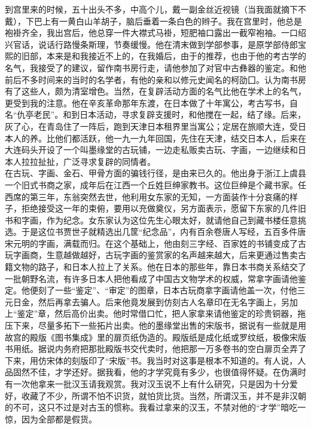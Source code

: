 到宫里来的时候，五十出头不多，中高个儿，戴一副金丝近视镜（当我面就摘下不戴），下巴上有一黄白山羊胡子，脑后垂着一条白色的辫子。我在宫里时，他总是袍褂齐全，我出宫后，他总穿一件大襟式马褂，短肥袖口露出一截窄袍袖。一口绍兴官话，说话行路慢条斯理，节奏缓慢。他在清末做到学部参事，是原学部侍郎宝熙的旧部，本来是和我接近不上的，在我婚后，由于的推荐，也由于他的考古学的名气，我接受了的建议，留作南书房行走，请他参加了对官中古彝器的鉴定。和他前后不多时间来的当时的名学者，有他的亲和以修元史闻名的柯劭囗。认为南书房有了这些人，颇为清室增色。当然，在复辟活动方面的名气比他在学术上的名气，更受到我的注意。他在辛亥革命那年东渡，在日本做了十年寓公，考古写书，自名“仇亭老民”。和到日本活动，寻求复辟支援时，和他搅在一起，结了缘。后来，灰了心，在青岛住了一阵后，跑到天津日本租界里当寓公；定居在旅顺大连，受日本人的养。比他们都活跃，他一九一九年回国，先住在天津，结交日本人，后来在大连码头开设了一个叫墨缘堂的古玩铺，一边走私贩卖古玩、字画，一边继续和日本人拉拉扯扯，广泛寻求复辟的同情者。\\

在古玩、字画、金石、甲骨方面的骗钱行径，是由来已久的。他出身于浙江上虞县一个旧式书商之家，成年后在江西一个丘姓巨绅家教书。这位巨绅是个藏书家。任西席的第三年，东翁突然去世，他利用女东家的无知，一方面装作十分哀痛的样子，拒绝接受这一年的束俯，要用以充做奠仪，另方面表示，愿留下东家的几件旧书和字画，作为纪念。女东家认为这位先生心眼太好，就请他自己到藏书楼任意挑选。于是这位书贾世子就精选出几筐“纪念品”，内有百余卷唐人写经，五百多件唐宋元明的字画，满载而归。在这个基础上，他由刻三字经、百家姓的书铺变成了古玩字画商，生意越做越好，古玩字画的鉴赏家的名声越来越大，后来更通过售卖古籍文物的路子，和日本人拉上了关系。他在日本的那些年，靠日本书商关系结交了一批朝野名流，有许多日本人把他看成了中国古文物学术的权威，常拿字画请他鉴定。他便刻了一些“鉴定”、“审定”的图章，日本古玩商拿字画请他盖一次，付他三元日金，然后再拿去骗人。后来他竟发展到仿刻古人名章印在无名字画上，另加上“鉴定”章，然后高价出卖。他时常借口忙，把人家拿来请他鉴定的珍贵铜器，拖压下来，尽量多拓下一些拓片出卖。他的墨缘堂出售的宋版书，据说有一些就是用故宫的殿版《图书集成》里的扉页纸伪造的。殿版纸是成化纸或罗纹纸，极像宋版书用纸。据说内务府把那批殿版书交代卖时，他把那一万多卷书的空白扉页全弄了下来，用仿宋体的刻版印了“宋版”书。我当时对这事是根本不知道的。有人说，人品固然不佳，才学还好。据我看，他的才学究竟有多少，也很值得怀疑。在伪满时有一次他拿来一批汉玉请我观赏。我对汉玉说不上有什么研究，只是因为十分爱好，收藏了不少，所谓不怕不识货，就怕货比货。当然，所谓汉玉，并不是非汉朝的不可，这只不过是对古玉的惯称。我看过拿来的汉玉，不禁对他的“才学”暗吃一惊，因为全部都是假货。\\

